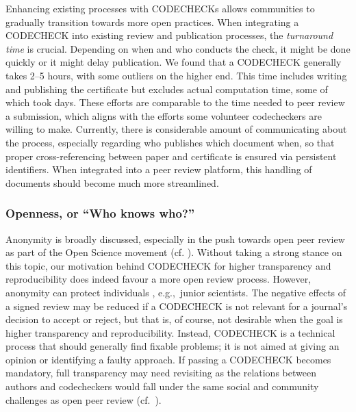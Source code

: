\documentclass[12pt]{article}
\begin{document}
Enhancing existing processes with CODECHECKs allows communities to
gradually transition towards more open practices.
When integrating a CODECHECK into existing review and publication processes, the \emph{turnaround time} is crucial.
Depending on when and who conducts the check, it might be done quickly
or it might delay publication.
We found that a CODECHECK generally takes  2--5 hours, with some outliers on the higher end.
This time includes writing and publishing the certificate but excludes
actual computation time, some of which took days.
These efforts are comparable to the time needed to peer review a submission,
which aligns with the efforts some volunteer codecheckers are willing to
make.
Currently, there is considerable amount of communicating about the
process, especially regarding who publishes which document when, so that proper
cross-referencing between paper and certificate is ensured via persistent
identifiers.  When integrated into a peer review platform, this
handling of documents should become much more streamlined.

\subsubsection*{Openness, or ``Who knows who?''}\label{who-knows-who}

Anonymity is broadly discussed, especially in the push towards
open peer review as part of the Open Science movement 
(cf. \cite{ross-hellauer_guidelines_2019}).
Without taking a strong stance on this topic, our motivation 
behind CODECHECK
for higher transparency and reproducibility does indeed favour a more open 
review process.
However, anonymity can protect individuals
\cite{tennant_limitations_2020}, e.g.,~junior scientists.  
The negative effects of a signed review may be reduced if a CODECHECK is not relevant for a journal's decision to accept or reject, but that is, of course, not desirable when the goal is higher transparency and reproducibility.
Instead, CODECHECK is a technical process that should generally find fixable problems; it is not aimed at giving an opinion or identifying a faulty approach.
If passing a CODECHECK becomes mandatory, full transparency may need
revisiting as the relations between authors and codecheckers would fall under the
same social and community challenges as open peer review
(cf.~\cite{everythinghertz123}).
\end{document}

